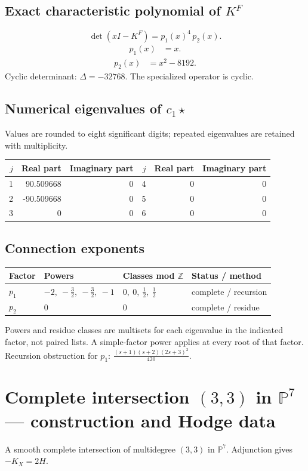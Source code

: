 \documentclass[10pt,a4paper]{article}
\begin{document}
\subsection*{Exact characteristic polynomial of $K^F$}
\[\det(xI-K^F)=p_{1}(x)^{4}\,p_{2}(x).\]
\[\begin{aligned}p_{1}(x)&=x.\end{aligned}\]
\[\begin{aligned}p_{2}(x)&=x^{2} - 8192.\end{aligned}\]
Cyclic determinant: $\Delta=-32768$. The specialized operator is cyclic.
\subsection*{Numerical eigenvalues of $c_1\star$}
Values are rounded to eight significant digits; repeated eigenvalues are retained with multiplicity.
\begin{center}\small\begin{tabular}{rrr@{\qquad}rrr}\toprule $j$ & Real part & Imaginary part & $j$ & Real part & Imaginary part\\\midrule
1 & 90.509668 & 0 & 4 & 0 & 0\\
2 & -90.509668 & 0 & 5 & 0 & 0\\
3 & 0 & 0 & 6 & 0 & 0\\
\bottomrule\end{tabular}\end{center}
\subsection*{Connection exponents}
\begin{center}\begin{tabular}{llll}\toprule Factor & Powers & Classes mod $\mathbb Z$ & Status / method\\\midrule
$p_{1}$ & $-2,\ - \frac{3}{2},\ - \frac{3}{2},\ -1$ & $0,\ 0,\ \frac{1}{2},\ \frac{1}{2}$ & complete / recursion\\
$p_{2}$ & $0$ & $0$ & complete / residue\\
\bottomrule\end{tabular}\end{center}
Powers and residue classes are multisets for each eigenvalue in the indicated factor, not paired lists. A simple-factor power applies at every root of that factor.
Recursion obstruction for $p_{1}$: $\frac{\left(s + 1\right) \left(s + 2\right) \left(2 s + 3\right)^{2}}{420}$.
\clearpage\section*{Complete intersection $(3,3)$ in $\mathbb P^{7}$ --- construction and Hodge data}\label{entry:PCI5-3-3}
A smooth complete intersection of multidegree $(3,3)$ in $\mathbb P^{7}$.
Adjunction gives $-K_X=2H$.
\end{document}
